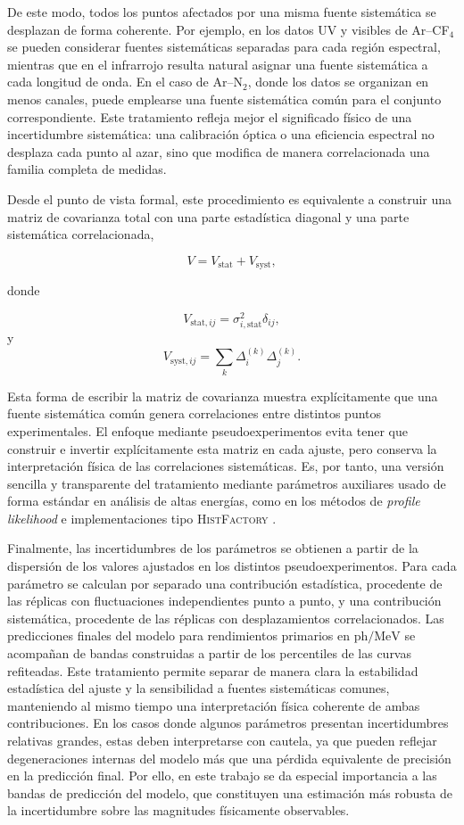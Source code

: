 \documentclass[12pt,a4paper]{article}
\begin{document}
De este modo, todos los puntos afectados por una misma fuente sistemática se desplazan de forma coherente. Por ejemplo, en los datos UV y visibles de Ar--CF$_4$ se pueden considerar fuentes sistemáticas separadas para cada región espectral, mientras que en el infrarrojo resulta natural asignar una fuente sistemática a cada longitud de onda. En el caso de Ar--N$_2$, donde los datos se organizan en menos canales, puede emplearse una fuente sistemática común para el conjunto correspondiente. Este tratamiento refleja mejor el significado físico de una incertidumbre sistemática: una calibración óptica o una eficiencia espectral no desplaza cada punto al azar, sino que modifica de manera correlacionada una familia completa de medidas.

Desde el punto de vista formal, este procedimiento es equivalente a construir una matriz de covarianza total con una parte estadística diagonal y una parte sistemática correlacionada,

\[
V
=
V_{\mathrm{stat}}
+
V_{\mathrm{syst}},
\]

donde

\[
V_{\mathrm{stat},ij}
=
\sigma_{i,\mathrm{stat}}^2\delta_{ij},
\]
y
\[
V_{\mathrm{syst},ij}
=\sum_k
\Delta_i^{(k)}\Delta_j^{(k)}.
\]

Esta forma de escribir la matriz de covarianza muestra explícitamente que una fuente sistemática común genera correlaciones entre distintos puntos experimentales. El enfoque mediante pseudoexperimentos evita tener que construir e invertir explícitamente esta matriz en cada ajuste, pero conserva la interpretación física de las correlaciones sistemáticas. Es, por tanto, una versión sencilla y transparente del tratamiento mediante parámetros auxiliares usado de forma estándar en análisis de altas energías, como en los métodos de \textit{profile likelihood} e implementaciones tipo \textsc{HistFactory} \cite{Cowan2011,Cranmer2012HistFactory}.

Finalmente, las incertidumbres de los parámetros se obtienen a partir de la dispersión de los valores ajustados en los distintos pseudoexperimentos. Para cada parámetro se calculan por separado una contribución estadística, procedente de las réplicas con fluctuaciones independientes punto a punto, y una contribución sistemática, procedente de las réplicas con desplazamientos correlacionados. Las predicciones finales del modelo para rendimientos primarios en $\mathrm{ph/MeV}$ se acompañan de bandas construidas a partir de los percentiles de las curvas refiteadas. Este tratamiento permite separar de manera clara la estabilidad estadística del ajuste y la sensibilidad a fuentes sistemáticas comunes, manteniendo al mismo tiempo una interpretación física coherente de ambas contribuciones. En los casos donde algunos parámetros presentan incertidumbres relativas grandes, estas deben interpretarse con cautela, ya que pueden reflejar degeneraciones internas del modelo más que una pérdida equivalente de precisión en la predicción final. Por ello, en este trabajo se da especial importancia a las bandas de predicción del modelo, que constituyen una estimación más robusta de la incertidumbre sobre las magnitudes físicamente observables.
\end{document}
